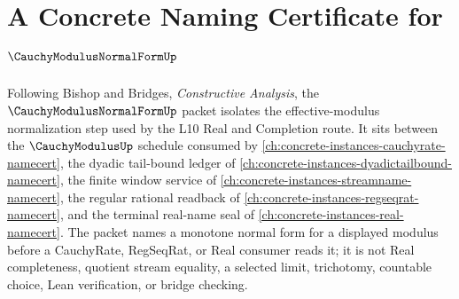\chapter{A Concrete Naming Certificate for $\CauchyModulusNormalFormUp$}
\label{ch:concrete-instances-cauchy-modulus-normal-form-namecert}

Following Bishop and Bridges, \emph{Constructive Analysis}, the $\CauchyModulusNormalFormUp$ packet isolates the effective-modulus normalization step used by the L10 Real and Completion route. It sits between the $\CauchyModulusUp$ schedule consumed by \autoref{ch:concrete-instances-cauchyrate-namecert}, the dyadic tail-bound ledger of \autoref{ch:concrete-instances-dyadictailbound-namecert}, the finite window service of \autoref{ch:concrete-instances-streamname-namecert}, the regular rational readback of \autoref{ch:concrete-instances-regseqrat-namecert}, and the terminal real-name seal of \autoref{ch:concrete-instances-real-namecert}. The packet names a monotone normal form for a displayed modulus before a CauchyRate, RegSeqRat, or Real consumer reads it; it is not Real completeness, quotient stream equality, a selected limit, trichotomy, countable choice, Lean verification, or bridge checking.

